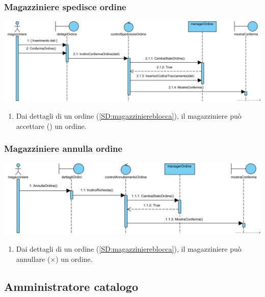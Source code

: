 \documentclass[12pt,a4paper]{article}
\begin{document}
\subsubsection{Magazziniere spedisce ordine}
\label{SD:magazzinierespedisce}
\begin{center}
\includegraphics[width=\textwidth]{SequenceDiagram/MagazziniereOrdineSpedisce}
\end{center}

\begin{enumerate}
\item Dai dettagli di un ordine (\ref{SD:magazziniereblocca}), il magazziniere può accettare (\checkmark) un ordine.
\end{enumerate}

\subsubsection{Magazziniere annulla ordine}
\label{SD:magazziniereannulla}
\begin{center}
\includegraphics[width=\textwidth]{SequenceDiagram/MagazziniereOrdineAnnulla}
\end{center}

\begin{enumerate}
\item Dai dettagli di un ordine (\ref{SD:magazziniereblocca}), il magazziniere può annullare ($\times$) un ordine.
\end{enumerate}

\newpage

\subsection{Amministratore catalogo}
\end{document}
